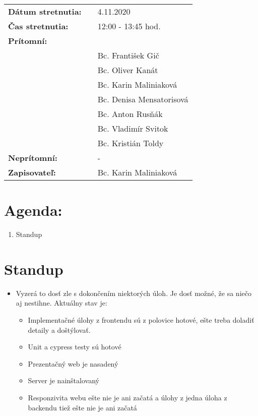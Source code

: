\documentclass{article}
\begin{document}
    

    \begin{table}[h]
        \begin{tabular}{lllll}
            \multicolumn{3}{l}{\textbf{Dátum stretnutia:}} & & 4.11.2020 \\
            \multicolumn{3}{l}{\textbf{Čas stretnutia:}} & & 12:00 - 13:45 hod. \\
            \multicolumn{3}{l}{\textbf{Prítomní:}} \\
            & & & & Bc. František Gič  \\
            & & & & Bc. Oliver Kanát \\
            & & & & Bc. Karin Maliniaková \\
            & & & & Bc. Denisa Mensatorisová \\
            & & & & Bc. Anton Rusňák \\
            & & & & Bc. Vladimír Svitok \\
            & & & & Bc. Kristián Toldy \\
            \multicolumn{3}{l}{\textbf{Neprítomní:}} & & -\\
            \multicolumn{3}{l}{\textbf{Zapisovateľ:}} & & Bc. Karin Maliniaková \\
        \end{tabular}
        \label{tab:grades}
    \end{table}

    \section*{Agenda:}

    \begin{enumerate}
        \item Standup
    \end{enumerate}

    \section*{Standup}

    \begin{itemize}
        \item Vyzerá to dosť zle s dokončením niektorých úloh. Je dosť možné, že sa niečo aj nestihne. Aktuálny stav je: 
        \begin{itemize}
            \item Implementačné úlohy z frontendu sú z polovice hotové, ešte treba doladiť detaily a doštýlovať. 
            \item Unit a cypress testy sú hotové
            \item Prezentačný web je nasadený
            \item Server je nainštalovaný
            \item Responzivita webu ešte nie je ani začatá a úlohy z jedna úloha z backendu tiež ešte nie je ani začatá
        \end{itemize}
    \end{itemize}
\end{document}
